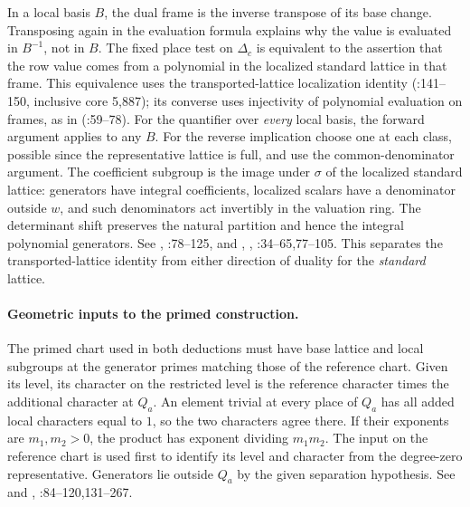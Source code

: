 In a local basis $B$, the dual frame is the inverse transpose of its
base change. Transposing again in the evaluation formula explains
why the value is evaluated in $B^{-1}$, not in $B$. The fixed
place test on $\Delta_c$ is equivalent to the assertion that the row
value comes from a polynomial in the localized standard lattice in
that frame. This equivalence uses the transported-lattice localization
identity 
(:141--150, inclusive core 5,887); its converse
uses injectivity of polynomial evaluation on frames, as in
(:59--78).
For the quantifier over \emph{every} local basis, the forward argument
applies to any $B$. For the reverse implication choose one at each
class, possible since the representative lattice is full, and use the
common-denominator argument. The coefficient subgroup is the image
under $\sigma$ of the localized standard lattice: generators have
integral coefficients, localized scalars have a denominator outside
$w$, and such denominators act invertibly in the valuation ring.
The determinant shift preserves the natural partition and hence the
integral polynomial generators. See ,
:78--125, and ,
, :34--65,77--105.
This separates the transported-lattice identity from either direction
of duality for the \emph{standard} lattice.

\paragraph{Geometric inputs to the primed construction.}
The primed chart used in both deductions must have base lattice and
local subgroups at the generator primes matching those of the reference
chart. Given its level, its character on the restricted level is the
reference character times the additional character at $Q_a$.
An element trivial at every place of $Q_a$ has all added local
characters equal to $1$, so the two characters agree there. If their
exponents are $m_1,m_2>0$, the product has exponent dividing $m_1m_2$.
The input  on the reference chart is used first to
identify its level and character from the degree-zero representative.
Generators lie outside $Q_a$ by the given separation hypothesis.
See  and ,
:84--120,131--267.


